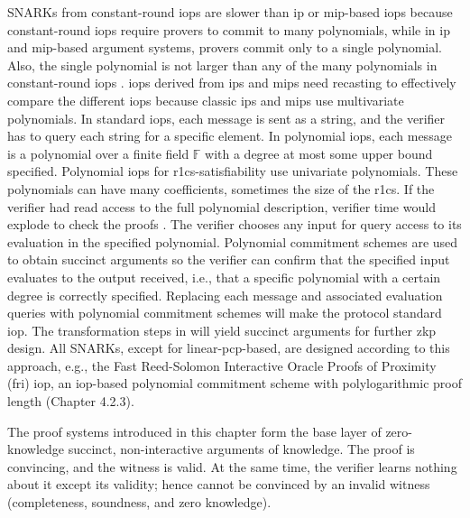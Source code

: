 SNARKs from constant-round \acrshort{iop}s are slower than \acrshort{ip} or \acrshort{mip}-based \acrshort{iop}s because constant-round \acrshort{iop}s require provers to commit to many polynomials, while in \acrshort{ip} and \acrshort{mip}-based argument systems, provers commit only to a single polynomial. Also, the single polynomial is not larger than any of the many polynomials in constant-round \acrshort{iop}s \citep{IOPconst}. \acrshort{iop}s derived from \acrshort{ip}s and \acrshort{mip}s need recasting to effectively compare the different \acrshort{iop}s because classic \acrshort{ip}s and \acrshort{mip}s use multivariate polynomials. In standard \acrshort{iop}s, each message is sent as a string, and the verifier has to query each string for a specific element. In polynomial \acrshort{iop}s, each message is a polynomial over a finite field \begin{math}\mathbb{F}\end{math} with a degree at most some upper bound specified. Polynomial \acrshort{iop}s for \acrshort{r1cs}-satisfiability use univariate polynomials. These polynomials can have many coefficients, sometimes the size of the \acrshort{r1cs}. If the verifier had read access to the full polynomial description, verifier time would explode to check the proofs \citep{IOPbuenz}. The verifier chooses any input for query access to its evaluation in the specified polynomial. Polynomial commitment schemes are used to obtain succinct arguments so the verifier can confirm that the specified input evaluates to the output received, i.e., that a specific polynomial with a certain degree is correctly specified. Replacing each message and associated evaluation queries with polynomial commitment schemes will make the protocol standard \acrshort{iop}. The transformation steps in \citet{IOPsdisc} will yield succinct arguments for further \acrshort{zkp} design. All SNARKs, except for linear-\acrshort{pcp}-based, are designed according to this approach, e.g., the Fast Reed-Solomon Interactive Oracle Proofs of Proximity (\acrshort{fri}) \acrshort{iop}, an \acrshort{iop}-based polynomial commitment scheme with polylogarithmic proof length (Chapter 4.2.3).

The proof systems introduced in this chapter form the base layer of zero-knowledge succinct, non-interactive arguments of knowledge. The proof is convincing, and the witness is valid. At the same time, the verifier learns nothing about it except its validity; hence cannot be convinced by an invalid witness (completeness, soundness, and zero knowledge).

